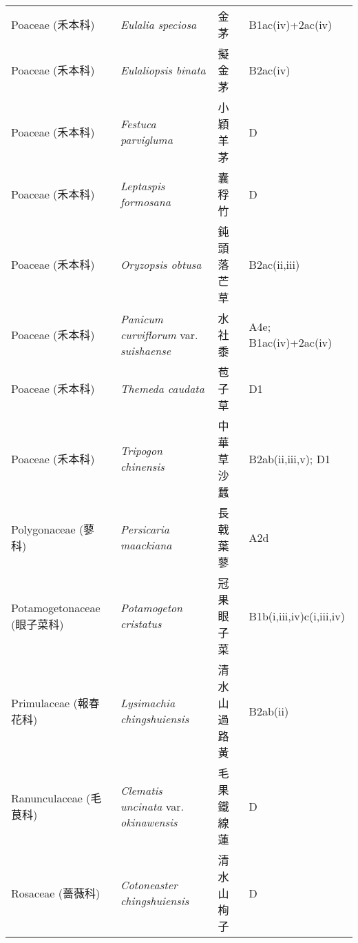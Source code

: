 \begin{longtable}{p{3cm}p{5cm}p{3cm}p{4cm}}
    Poaceae (禾本科) & \textit{Eulalia speciosa}  & 金茅 & B1ac(iv)+2ac(iv) \index{Eulalia@\textit{Eulalia}!speciosa@\textit{speciosa}}  \index{金茅} \\
    Poaceae (禾本科) & \textit{Eulaliopsis binata}  & 擬金茅 & B2ac(iv) \index{Eulaliopsis@\textit{Eulaliopsis}!binata@\textit{binata}}  \index{擬金茅} \\
    Poaceae (禾本科) & \textit{Festuca parvigluma}  & 小穎羊茅 & D \index{Festuca@\textit{Festuca}!parvigluma@\textit{parvigluma}}  \index{小穎羊茅} \\
    Poaceae (禾本科) & \textit{Leptaspis formosana}  & 囊稃竹 & D \index{Leptaspis@\textit{Leptaspis}!formosana@\textit{formosana}}  \index{囊稃竹} \\
    Poaceae (禾本科) & \textit{Oryzopsis obtusa}  & 鈍頭落芒草 & B2ac(ii,iii) \index{Oryzopsis@\textit{Oryzopsis}!obtusa@\textit{obtusa}}  \index{鈍頭落芒草} \\
    Poaceae (禾本科) & \textit{Panicum curviflorum} var. \textit{suishaense}  & 水社黍 & A4e; B1ac(iv)+2ac(iv) \index{Panicum@\textit{Panicum}!curviflorum@\textit{curviflorum}!var. suishaense@var. \textit{suishaense}}  \index{水社黍} \\
    Poaceae (禾本科) & \textit{Themeda caudata}  & 苞子草 & D1 \index{Themeda@\textit{Themeda}!caudata@\textit{caudata}}  \index{苞子草} \\
    Poaceae (禾本科) & \textit{Tripogon chinensis}  & 中華草沙蠶 & B2ab(ii,iii,v); D1 \index{Tripogon@\textit{Tripogon}!chinensis@\textit{chinensis}}  \index{中華草沙蠶} \\
    Polygonaceae (蓼科) & \textit{Persicaria maackiana}  & 長戟葉蓼 & A2d \index{Persicaria@\textit{Persicaria}!maackiana@\textit{maackiana}}  \index{長戟葉蓼} \\
    Potamogetonaceae (眼子菜科) & \textit{Potamogeton cristatus}  & 冠果眼子菜 & B1b(i,iii,iv)c(i,iii,iv) \index{Potamogeton@\textit{Potamogeton}!cristatus@\textit{cristatus}}  \index{冠果眼子菜} \\
    Primulaceae (報春花科) & \textit{Lysimachia chingshuiensis}  & 清水山過路黃 & B2ab(ii) \index{Lysimachia@\textit{Lysimachia}!chingshuiensis@\textit{chingshuiensis}}  \index{清水山過路黃} \\
    Ranunculaceae (毛茛科) & \textit{Clematis uncinata} var. \textit{okinawensis}  & 毛果鐵線蓮 & D \index{Clematis@\textit{Clematis}!uncinata@\textit{uncinata}!var. okinawensis@var. \textit{okinawensis}}  \index{毛果鐵線蓮} \\
    Rosaceae (薔薇科) & \textit{Cotoneaster chingshuiensis}  & 清水山栒子 & D \index{Cotoneaster@\textit{Cotoneaster}!chingshuiensis@\textit{chingshuiensis}}  \index{清水山栒子} \\

\end{longtable}
